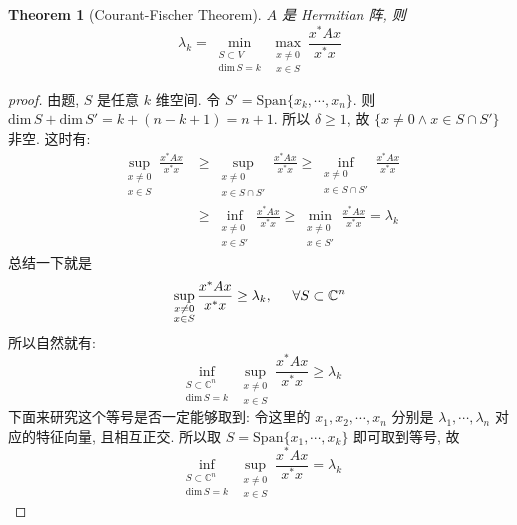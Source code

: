 \documentclass{article}
\newtheorem*{theorem}{Theorem}
\def\dim{\mathrm{dim}\,}
\begin{document}
\begin{theorem}[Courant-Fischer Theorem]
  $A$ 是 Hermitian 阵, 则
  \[\lambda_k = \min_{\substack{S\subset V\\ \dim S = k}}\max_{\substack{x\not=0\\x\in S}}\frac{x^*Ax}{x^*x}\]
\end{theorem}
\begin{proof}[proof]
  由题, $S$ 是任意 $k$ 维空间.
  令 $S' = \mathrm{Span}\{x_k, \cdots, x_n\}$.
  则 $\dim S + \dim S' = k + (n - k + 1) = n + 1$.
  所以 $\delta \geq 1$, 故 $\{x\not=0 \land x\in S\cap S'\}$ 非空.
  这时有:
  \begin{align*}
    \sup_{\substack{x\not=0\\x\in S}}\frac{x^*Ax}{x^*x} &\geq \sup_{\substack{x\not=0\\x\in S\cap S'}}\frac{x^*Ax}{x^*x} \geq \inf_{\substack{x\not=0\\x\in S\cap S'}} \frac{x^*Ax}{x^*x} \\
    &\geq \inf_{\substack{x\not=0\\x\in S'}}\frac{x^*Ax}{x^*x} \geq \min_{\substack{x\not=0\\x\in S'}}\frac{x^*Ax}{x^*x} = \lambda_k
  \end{align*}
  总结一下就是
  \[\sup_{\substack{x\not=0\\x\in S}} \frac{x^*Ax}{x^*x} \geq \lambda_k, \hspace{0.5cm} \forall S\subset \mathbb{C}^n\]
  所以自然就有:
  \[\inf_{\substack{S\subset \mathbb{C}^n\\ \dim S = k}}\sup_{\substack{x\not=0\\x\in S}} \frac{x^*Ax}{x^*x} \geq \lambda_k\]
  下面来研究这个等号是否一定能够取到:
  令这里的 $x_1, x_2, \cdots, x_n$ 分别是 $\lambda_1, \cdots, \lambda_n$ 对应的特征向量, 且相互正交.
  所以取 $S = \mathrm{Span}\{x_1, \cdots, x_k\}$ 即可取到等号, 故
  \[\inf_{\substack{S\subset \mathbb{C}^n\\ \dim S = k}}\sup_{\substack{x\not=0\\x\in S}} \frac{x^*Ax}{x^*x} = \lambda_k\]
\end{proof}
\end{document}
